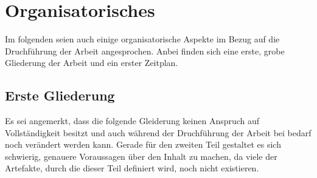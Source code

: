 \section{Organisatorisches}

Im folgenden seien auch einige organisatorische Aspekte im Bezug auf die Druchführung der Arbeit angesprochen. Anbei finden sich eine erste, grobe Gliederung der Arbeit und ein erster Zeitplan.

\subsection{Erste Gliederung}
Es sei angemerkt, dass die folgende Gleiderung keinen Anspruch auf Vollständigkeit besitzt und auch während der Druchführung der Arbeit bei bedarf noch verändert werden kann.
Gerade für den zweiten Teil gestaltet es sich schwierig, genauere Voraussagen über den Inhalt zu machen, da viele der Artefakte, durch die dieser Teil definiert wird, noch nicht existieren.


